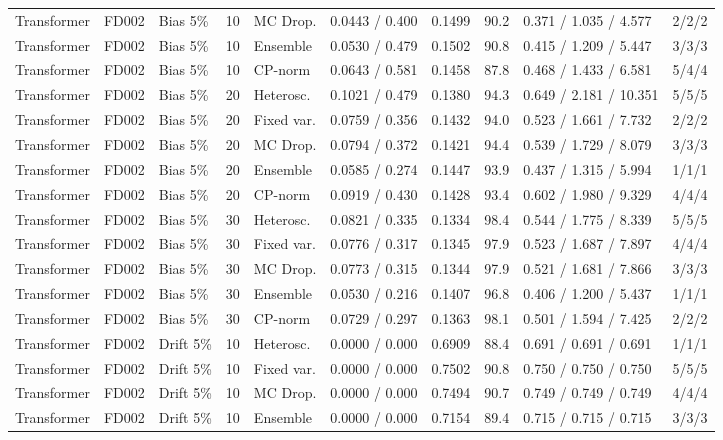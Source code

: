 \documentclass[10pt,a4paper]{article}
\begin{document}
\begin{landscape}
\begin{center}
\begin{longtable}{lllllcclll}
Transformer & FD002 & Bias 5\% & 10 & MC Drop. & 0.0443 / 0.400 & 0.1499 & 90.2 & 0.371 / 1.035 / 4.577 & 2/2/2 \\
Transformer & FD002 & Bias 5\% & 10 & Ensemble & 0.0530 / 0.479 & 0.1502 & 90.8 & 0.415 / 1.209 / 5.447 & 3/3/3 \\
Transformer & FD002 & Bias 5\% & 10 & CP-norm & 0.0643 / 0.581 & 0.1458 & 87.8 & 0.468 / 1.433 / 6.581 & 5/4/4 \\
Transformer & FD002 & Bias 5\% & 20 & Heterosc. & 0.1021 / 0.479 & 0.1380 & 94.3 & 0.649 / 2.181 / 10.351 & 5/5/5 \\
Transformer & FD002 & Bias 5\% & 20 & Fixed var. & 0.0759 / 0.356 & 0.1432 & 94.0 & 0.523 / 1.661 / 7.732 & 2/2/2 \\
Transformer & FD002 & Bias 5\% & 20 & MC Drop. & 0.0794 / 0.372 & 0.1421 & 94.4 & 0.539 / 1.729 / 8.079 & 3/3/3 \\
Transformer & FD002 & Bias 5\% & 20 & Ensemble & 0.0585 / 0.274 & 0.1447 & 93.9 & 0.437 / 1.315 / 5.994 & 1/1/1 \\
Transformer & FD002 & Bias 5\% & 20 & CP-norm & 0.0919 / 0.430 & 0.1428 & 93.4 & 0.602 / 1.980 / 9.329 & 4/4/4 \\
Transformer & FD002 & Bias 5\% & 30 & Heterosc. & 0.0821 / 0.335 & 0.1334 & 98.4 & 0.544 / 1.775 / 8.339 & 5/5/5 \\
Transformer & FD002 & Bias 5\% & 30 & Fixed var. & 0.0776 / 0.317 & 0.1345 & 97.9 & 0.523 / 1.687 / 7.897 & 4/4/4 \\
Transformer & FD002 & Bias 5\% & 30 & MC Drop. & 0.0773 / 0.315 & 0.1344 & 97.9 & 0.521 / 1.681 / 7.866 & 3/3/3 \\
Transformer & FD002 & Bias 5\% & 30 & Ensemble & 0.0530 / 0.216 & 0.1407 & 96.8 & 0.406 / 1.200 / 5.437 & 1/1/1 \\
Transformer & FD002 & Bias 5\% & 30 & CP-norm & 0.0729 / 0.297 & 0.1363 & 98.1 & 0.501 / 1.594 / 7.425 & 2/2/2 \\
Transformer & FD002 & Drift 5\% & 10 & Heterosc. & 0.0000 / 0.000 & 0.6909 & 88.4 & 0.691 / 0.691 / 0.691 & 1/1/1 \\
Transformer & FD002 & Drift 5\% & 10 & Fixed var. & 0.0000 / 0.000 & 0.7502 & 90.8 & 0.750 / 0.750 / 0.750 & 5/5/5 \\
Transformer & FD002 & Drift 5\% & 10 & MC Drop. & 0.0000 / 0.000 & 0.7494 & 90.7 & 0.749 / 0.749 / 0.749 & 4/4/4 \\
Transformer & FD002 & Drift 5\% & 10 & Ensemble & 0.0000 / 0.000 & 0.7154 & 89.4 & 0.715 / 0.715 / 0.715 & 3/3/3 \\

\end{longtable}
\end{center}
\end{landscape}
\end{document}
